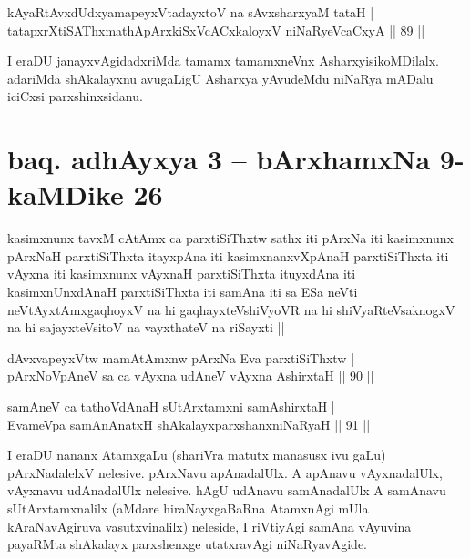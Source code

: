 \begin{shl}
kAyaRtAvxdUdxyamapeyxVtadayxtoV na sAvxsharxyaM tataH |\\
tatapxrXtiSAThxmathApArxkiSxVcACxkaloyxV niNaRyeVcaCxyA \hfill || 89 ||
\end{shl}

\begin{artha}
I eraDU janayxvAgidadxriMda tamamx tamamxneVnx AsharxyisikoMDilalx. adariMda shAkalayxnu avugaLigU Asharxya yAvudeMdu niNaRya mADalu iciCxsi parxshinxsidanu.
\end{artha}%

\section*{baq. adhAyxya 3 -- bArxhamxNa 9-kaMDike 26}

\begin{shl}
kasimxnunx tavxM cAtAmx ca parxtiSiThxtw sathx iti pArxNa iti kasimxnunx pArxNaH parxtiSiThxta itayxpAna iti kasimxnanxvXpAnaH parxtiSiThxta iti vAyxna iti kasimxnunx vAyxnaH parxtiSiThxta ituyxdAna iti kasimxnUnxdAnaH parxtiSiThxta iti samAna iti sa ESa neVti neVtAyxtAmxgaqhoyxV na hi gaqhayxteV\s shiVyoVR na hi shiVyaRteV\s saknogxV na hi sajayxteV\s sitoV na vayxthateV na riSayxti ||
\end{shl}

\begin{shl}
dAvxvapeyxVtw mamA\s \s tAmxnw pArxNa Eva parxtiSiThxtw |\\
pArxNoV\s pAneV sa ca vAyxna udAneV vAyxna AshirxtaH \hfill || 90 ||
\end{shl}

\begin{shl}
samAneV ca tathoVdAnaH sUtArxtamxni samAshirxtaH |\\
EvameVpa samAnAnatxH shAkalayxparxshanxniNaRyaH \hfill || 91 ||
\end{shl}

\begin{artha}
I eraDU nananx AtamxgaLu (shariVra matutx manasusx ivu gaLu) pArxNadalelxV nelesive. pArxNavu apAnadalUlx. A apAnavu vAyxnadalUlx, vAyxnavu udAnadalUlx nelesive. hAgU udAnavu samAnadalUlx A samAnavu sUtArxtamxnalilx (aMdare hiraNayxgaBaRna AtamxnAgi mUla kAraNavAgiruva vasutxvinalilx) neleside, I riVtiyAgi samAna vAyuvina payaRMta shAkalayx parxshenxge utatxravAgi niNaRyavAgide.
\end{artha}


